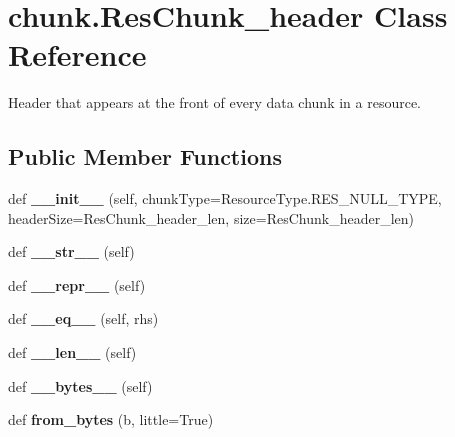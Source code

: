 \hypertarget{classchunk_1_1ResChunk__header}{}\section{chunk.\+Res\+Chunk\+\_\+header Class Reference}
\label{classchunk_1_1ResChunk__header}


Header that appears at the front of every data chunk in a resource.  


\subsection*{Public Member Functions}
\begin{DoxyCompactItemize}
\item 
\mbox{\label{classchunk_1_1ResChunk__header_ade81a882da835dd12285942679cfc49b}} 
def {\bfseries \+\_\+\+\_\+init\+\_\+\+\_\+} (self, chunk\+Type=Resource\+Type.\+R\+E\+S\+\_\+\+N\+U\+L\+L\+\_\+\+T\+Y\+PE, header\+Size=Res\+Chunk\+\_\+header\+\_\+len, size=Res\+Chunk\+\_\+header\+\_\+len)
\item 
\mbox{\label{classchunk_1_1ResChunk__header_a0be1071bafde5cd135f51d8af015df21}} 
def {\bfseries \+\_\+\+\_\+str\+\_\+\+\_\+} (self)
\item 
\mbox{\label{classchunk_1_1ResChunk__header_a49d382c1c0ca9fef8ef534f0f6f947f3}} 
def {\bfseries \+\_\+\+\_\+repr\+\_\+\+\_\+} (self)
\item 
\mbox{\label{classchunk_1_1ResChunk__header_a5caccbe2486f464e4d35bdb4abc10312}} 
def {\bfseries \+\_\+\+\_\+eq\+\_\+\+\_\+} (self, rhs)
\item 
\mbox{\label{classchunk_1_1ResChunk__header_aa5324301c71a55aad1a96ea3d05579d0}} 
def {\bfseries \+\_\+\+\_\+len\+\_\+\+\_\+} (self)
\item 
\mbox{\label{classchunk_1_1ResChunk__header_ad23eb20cf1328d39dd203195e44c3a9c}} 
def {\bfseries \+\_\+\+\_\+bytes\+\_\+\+\_\+} (self)
\item 
\mbox{\label{classchunk_1_1ResChunk__header_a8f6d64201e2b005648de98f1d61c9b57}} 
def {\bfseries from\+\_\+bytes} (b, little=True)
\end{DoxyCompactItemize}
